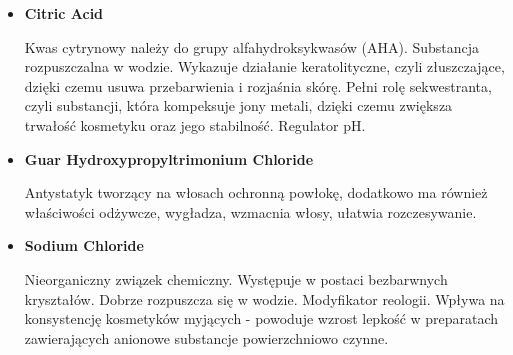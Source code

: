 \begin{itemize}


\item \textbf{Citric Acid}

Kwas cytrynowy należy do grupy alfahydroksykwasów (AHA). Substancja rozpuszczalna w wodzie. Wykazuje działanie keratolityczne, czyli złuszczające, dzięki czemu usuwa przebarwienia i rozjaśnia skórę. Pełni rolę sekwestranta, czyli substancji, która kompeksuje jony metali, dzięki czemu zwiększa trwałość kosmetyku oraz jego stabilność. Regulator pH.

\item \textbf{Guar Hydroxypropyltrimonium Chloride}

Antystatyk tworzący na włosach ochronną powłokę, dodatkowo ma również właściwości odżywcze, wygładza, wzmacnia włosy, ułatwia rozczesywanie.



\item \textbf{Sodium Chloride}

Nieorganiczny związek chemiczny. Występuje w postaci bezbarwnych kryształów. Dobrze rozpuszcza się w wodzie. Modyfikator reologii. Wpływa na konsystencję kosmetyków myjących - powoduje wzrost lepkość w preparatach zawierających anionowe substancje powierzchniowo czynne.


\end{itemize}
